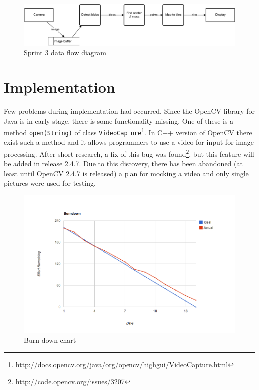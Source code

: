 \begin{figure}[h]
	\centering
		\includegraphics[width=16.2cm]{sprint3/sprint3_dtd.pdf}
	\caption{Sprint 3 data flow diagram}
	\label{fig:sprint3_dfd}
\end{figure}


\section{Implementation}
\label{sec:sprint3_implementation}
Few problems during implementation had occurred. 
Since the OpenCV library for Java is in early stage, there is some functionality missing.
One of these is a method \texttt{open(String)} of class \texttt{VideoCapture}\footnote{\url{http://docs.opencv.org/java/org/opencv/highgui/VideoCapture.html}}.
In C++ version of OpenCV there exist such a method and it allows programmers to use a video for input for image processing.
After short research, a fix of this bug was found\footnote{\url{http://code.opencv.org/issues/3207}}, but this feature will be added in release 2.4.7.
Due to this discovery, there has been abandoned (at least until OpenCV 2.4.7 is released) a plan for mocking a video and only single pictures were used for testing.

\begin{figure}[h]
	\centering
		\includegraphics[width=18cm]{sprint3/BurndownSprint3.png}
	\caption{Burn down chart}
	\label{fig:Burn3 }
\end{figure}


